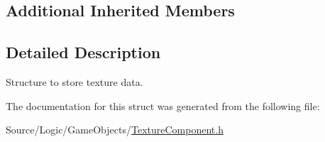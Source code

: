 \subsection*{Additional Inherited Members}


\subsection{Detailed Description}
Structure to store texture data. 

The documentation for this struct was generated from the following file\+:\begin{DoxyCompactItemize}
\item 
Source/\+Logic/\+Game\+Objects/\mbox{\hyperlink{_texture_component_8h}{Texture\+Component.\+h}}\end{DoxyCompactItemize}
